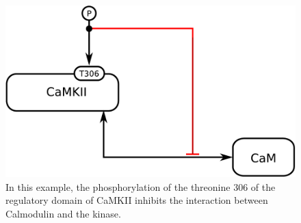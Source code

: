 \begin{figure}[H]
  \centering
  \includegraphics[scale = 0.5]{examples/ex-inhibition}
  \caption{In this example, the phosphorylation of the threonine 306 of the regulatory domain of CaMKII inhibits the interaction between Calmodulin and the kinase.}
  \label{fig:ex-inhibition}
\end{figure}


